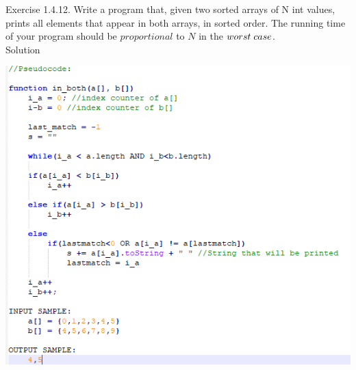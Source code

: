 \documentclass[11pt,fleqn]{article}
\begin{document}
Exercise 1.4.12. Write a program that, given two sorted arrays of N int values, prints all elements
that appear in both arrays, in sorted order. The running time of your program
should be $proportional$ to $N$ in the $worst \thickspace case$.\\

Solution

\begin{center}
	\includegraphics[scale = 1]{1.4.12.png}
	\end{center}
\end{document}
